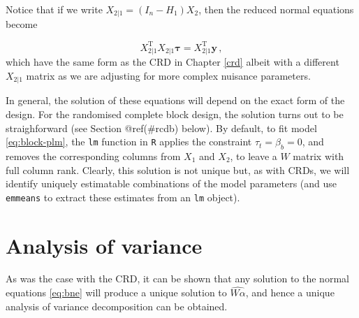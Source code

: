 \documentclass[
]{book}
\newenvironment{Shaded}{\begin{snugshade}}{\end{snugshade}}
\newcommand{\CommentTok}[1]{\textcolor[rgb]{0.56,0.35,0.01}{\textit{#1}}}
\newcommand{\DecValTok}[1]{\textcolor[rgb]{0.00,0.00,0.81}{#1}}
\newcommand{\FunctionTok}[1]{\textcolor[rgb]{0.00,0.00,0.00}{#1}}
\newcommand{\NormalTok}[1]{#1}
\newcommand{\OtherTok}[1]{\textcolor[rgb]{0.56,0.35,0.01}{#1}}
\newcommand{\SpecialCharTok}[1]{\textcolor[rgb]{0.00,0.00,0.00}{#1}}
\theoremstyle{definition}
\theoremstyle{definition}
\theoremstyle{definition}
\theoremstyle{definition}
\theoremstyle{remark}
\begin{document}
\begin{Shaded}
\end{Shaded}

Notice that if we write \(X_{2|1} = (I_n - H_1)X_2\), then the reduced normal equations become

\[
X_{2|1}^{\mathrm{T}}X_{2|1}\boldsymbol{\tau} = X_{2|1}^{\mathrm{T}}\boldsymbol{y}\,,
\]
which have the same form as the CRD in Chapter \ref{crd} albeit with a different \(X_{2|1}\) matrix as we are adjusting for more complex nuisance parameters.

In general, the solution of these equations will depend on the exact form of the design. For the randomised complete block design, the solution turns out to be straighforward (see Section @ref(\#rcdb) below). By default, to fit model \eqref{eq:block-plm}, the \texttt{lm} function in \texttt{R} applies the constraint \(\tau_t = \beta_b = 0\), and removes the corresponding columns from \(X_1\) and \(X_2\), to leave a \(W\) matrix with full column rank. Clearly, this solution is not unique but, as with CRDs, we will identify uniquely estimatable combinations of the model parameters (and use \texttt{emmeans} to extract these estimates from an \texttt{lm} object).

\hypertarget{block-anova}{%
\section{Analysis of variance}\label{block-anova}}

As was the case with the CRD, it can be shown that any solution to the normal equations \eqref{eq:bne} will produce a unique solution to \(\widehat{W\alpha}\), and hence a unique analysis of variance decomposition can be obtained.
\end{document}
